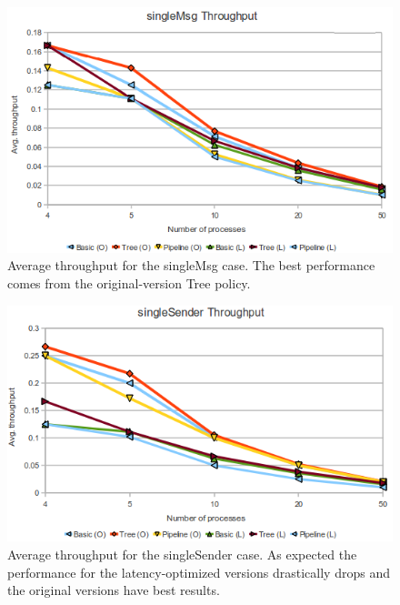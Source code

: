 \documentclass[a4paper, 11pt]{article}
\begin{document}
\begin{figure}[htp]
  \centering
  \includegraphics[scale=0.6]{avgTpSingleMsg.png}
	\caption{Average throughput for the singleMsg case. The best performance comes from the original-version Tree policy.}
  \label{fig:avgTpSingleMsg}
\end{figure}

\begin{figure}[htp]
  \centering
  \includegraphics[scale=0.6]{avgTpSingleSender.png}
	\caption{Average throughput for the singleSender case. As expected the performance for the latency-optimized versions drastically drops and the original versions have best results.}
  \label{fig:avgTpSingleSender}
\end{figure}
\end{document}
